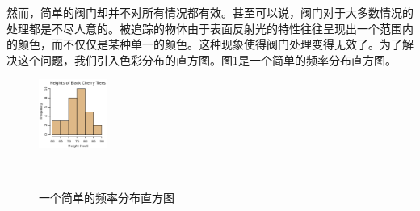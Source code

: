 然而，简单的阀门却并不对所有情况都有效。甚至可以说，阀门对于大多数情况的处理都是不尽人意的。被追踪的物体由于表面反射光的特性往往呈现出一个范围内的颜色，而不仅仅是某种单一的颜色。这种现象使得阀门处理变得无效了。为了解决这个问题，我们引入色彩分布的直方图。图1是一个简单的频率分布直方图。

\begin{figure}[h]

  \centering
    \includegraphics[width=0.2\textwidth]{../Pictures/histogram.JPG}
    \caption{一个简单的频率分布直方图\cite{cite5}}\\
\end{figure}

